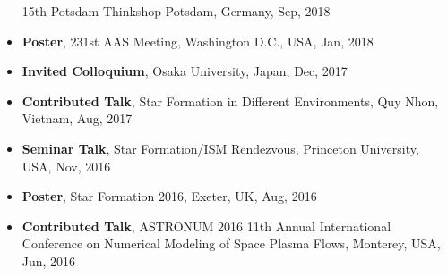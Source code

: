 \documentclass[11pt,letterpaper,roman]{moderncv}        %
\begin{document}
\begin{itemize}
  15th Potsdam Thinkshop
  Potsdam, Germany, Sep, 2018 %
\item \textbf{Poster},
  231st AAS Meeting, Washington D.C., USA, Jan, 2018 %
\item \textbf{Invited Colloquium},
  Osaka University, Japan, Dec, 2017 %
\item \textbf{Contributed Talk},
  Star Formation in Different Environments, Quy Nhon, Vietnam, Aug, 2017 %
\item \textbf{Seminar Talk},
  Star Formation/ISM Rendezvous, Princeton University, USA, Nov, 2016 %
\item \textbf{Poster},
  Star Formation 2016, Exeter, UK, Aug, 2016 %
\item \textbf{Contributed Talk},
  ASTRONUM 2016 11th Annual International Conference on Numerical Modeling of Space Plasma Flows, Monterey, USA, Jun, 2016 %

\end{itemize}
\end{document}
